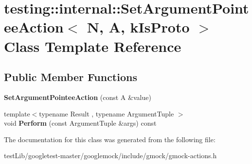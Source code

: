 \hypertarget{classtesting_1_1internal_1_1SetArgumentPointeeAction}{}\section{testing\+:\+:internal\+:\+:Set\+Argument\+Pointee\+Action$<$ N, A, k\+Is\+Proto $>$ Class Template Reference}
\label{classtesting_1_1internal_1_1SetArgumentPointeeAction}
\subsection*{Public Member Functions}
\begin{DoxyCompactItemize}
\item 
\mbox{\label{classtesting_1_1internal_1_1SetArgumentPointeeAction_a5a4119ed113667bd4a003ab0bec2cdff}} 
{\bfseries Set\+Argument\+Pointee\+Action} (const A \&value)
\item 
\mbox{\label{classtesting_1_1internal_1_1SetArgumentPointeeAction_a128320dcf991ff7f1a0087dab38b4014}} 
{\footnotesize template$<$typename Result , typename Argument\+Tuple $>$ }\\void {\bfseries Perform} (const Argument\+Tuple \&args) const
\end{DoxyCompactItemize}


The documentation for this class was generated from the following file\+:\begin{DoxyCompactItemize}
\item 
test\+Lib/googletest-\/master/googlemock/include/gmock/gmock-\/actions.\+h\end{DoxyCompactItemize}
